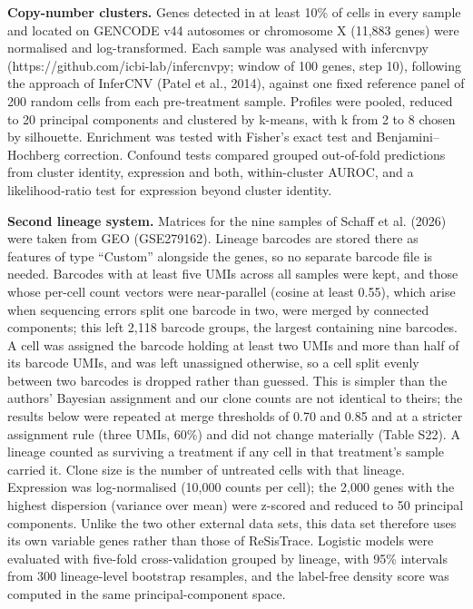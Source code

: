 \documentclass[11pt,a4paper]{article}
\begin{document}
\textbf{Copy-number clusters.} Genes detected in at least 10\% of cells in every sample and located on GENCODE v44 autosomes or chromosome X (11,883 genes) were normalised and log-transformed. Each sample was analysed with infercnvpy (https://github.com/icbi-lab/infercnvpy; window of 100 genes, step 10), following the approach of InferCNV (Patel et al., 2014), against one fixed reference panel of 200 random cells from each pre-treatment sample. Profiles were pooled, reduced to 20 principal components and clustered by k-means, with k from 2 to 8 chosen by silhouette. Enrichment was tested with Fisher's exact test and Benjamini--Hochberg correction. Confound tests compared grouped out-of-fold predictions from cluster identity, expression and both, within-cluster AUROC, and a likelihood-ratio test for expression beyond cluster identity.

\textbf{Second lineage system.} Matrices for the nine samples of Schaff et al. (2026) were taken from GEO (GSE279162). Lineage barcodes are stored there as features of type ``Custom'' alongside the genes, so no separate barcode file is needed. Barcodes with at least five UMIs across all samples were kept, and those whose per-cell count vectors were near-parallel (cosine at least 0.55), which arise when sequencing errors split one barcode in two, were merged by connected components; this left 2,118 barcode groups, the largest containing nine barcodes. A cell was assigned the barcode holding at least two UMIs and more than half of its barcode UMIs, and was left unassigned otherwise, so a cell split evenly between two barcodes is dropped rather than guessed. This is simpler than the authors' Bayesian assignment and our clone counts are not identical to theirs; the results below were repeated at merge thresholds of 0.70 and 0.85 and at a stricter assignment rule (three UMIs, 60\%) and did not change materially (Table S22). A lineage counted as surviving a treatment if any cell in that treatment's sample carried it. Clone size is the number of untreated cells with that lineage. Expression was log-normalised (10,000 counts per cell); the 2,000 genes with the highest dispersion (variance over mean) were z-scored and reduced to 50 principal components. Unlike the two other external data sets, this data set therefore uses its own variable genes rather than those of ReSisTrace. Logistic models were evaluated with five-fold cross-validation grouped by lineage, with 95\% intervals from 300 lineage-level bootstrap resamples, and the label-free density score was computed in the same principal-component space.
\end{document}

